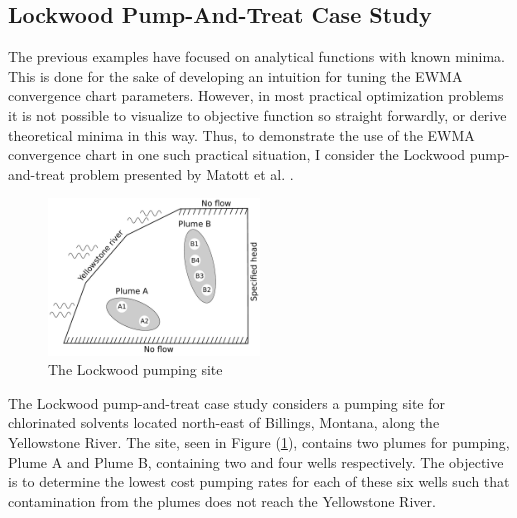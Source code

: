 \documentclass[12pt]{article}
\begin{document}
	\clearpage
	\subsection{Lockwood Pump-And-Treat Case Study}
	
	The previous examples have focused on analytical functions with known minima.
	This is done for the sake of developing an intuition for tuning the EWMA convergence chart parameters.
	However, in most practical optimization problems it is not possible to visualize to objective function so straight forwardly, or derive theoretical minima in this way.
	Thus, to demonstrate the use of the EWMA convergence chart in one such practical situation, I consider the Lockwood pump-and-treat problem presented by Matott et al. \cite{lockCite}. \\
	
	\begin{figure}
	\vspace{0.3cm}
	\centering
	\includegraphics[width=0.5\textwidth]{./figures/Lockwood_Site_Simple.pdf}
	\caption{The Lockwood pumping site}
	\label{lockSite}
	\end{figure}
	\vspace{-0.3cm}
	
	The Lockwood pump-and-treat case study considers a pumping site for chlorinated solvents located north-east of Billings, Montana, along the Yellowstone River.
	The site, seen in Figure (\ref{lockSite}), contains two plumes for pumping, Plume A and Plume B, containing two and four wells respectively.
	The objective is to determine the lowest cost pumping rates for each of these six wells such that contamination from the plumes does not reach the Yellowstone River.
	
	
\end{document}
